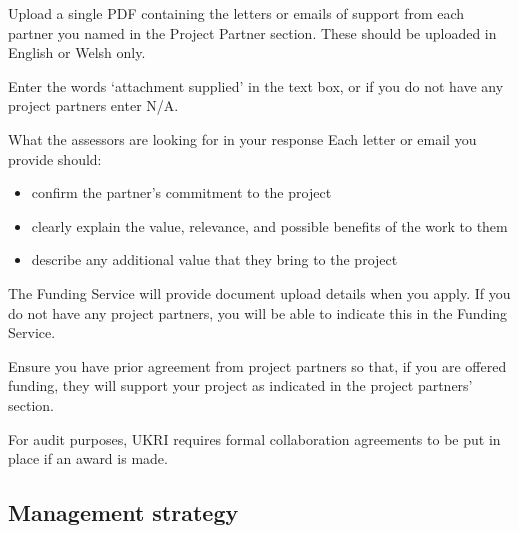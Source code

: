 \documentclass[12in]{article}
\begin{document}
{\color{red}

Upload a single PDF containing the letters or emails of support from each
partner you named in the Project Partner section. These should be uploaded in
English or Welsh only.

Enter the words ‘attachment supplied’ in the text box, or if you do not have any
project partners enter N/A.

What the assessors are looking for in your response
Each letter or email you provide should:

\begin{itemize}

	\item confirm the partner’s commitment to the project

	\item clearly explain the value, relevance, and possible benefits of the work to
them

	\item describe any additional value that they bring to the project

\end{itemize}

The Funding Service will provide document upload details when you apply. If
you do not have any project partners, you will be able to indicate this in the
Funding Service.

Ensure you have prior agreement from project partners so that, if you are
offered funding, they will support your project as indicated in the project
partners’ section.

For audit purposes, UKRI requires formal collaboration agreements to be put in
place if an award is made.

}

\pagebreak

\subsection{Management strategy}
\end{document}
